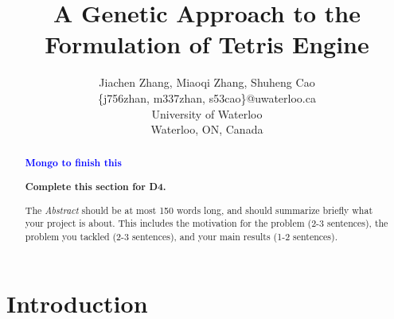 \documentclass[letterpaper]{article} %
\begin{document}
%
\title{A Genetic Approach to the Formulation of Tetris Engine}
\author{Jiachen Zhang, Miaoqi Zhang, Shuheng Cao\\
\{j756zhan, m337zhan, s53cao\}@uwaterloo.ca\\
University of Waterloo\\
Waterloo, ON, Canada\\
}
\maketitle
\newcommand\bi[1]{{\textcolor{black}{#1}}}
\newcommand\blue[1]{\textcolor{blue}{\textbf{#1}}}

\begin{abstract}
\blue{Mongo to finish this}

{\bf Complete this section for D4.}

The {\it Abstract} should be at most 150 words long, and should summarize briefly what your project is about.  This includes the motivation for the problem (2-3 sentences), the problem you tackled (2-3 sentences), and your main results (1-2 sentences).   

\end{abstract}

\section{Introduction} 
\end{document}
